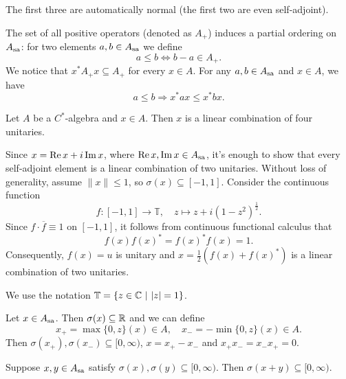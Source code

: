 \begin{remark}
  The first three are automatically normal (the first two are even self-adjoint).
\end{remark}

The set of all positive operators (denoted as $A_+$) induces a partial ordering on $A_{\operatorname{sa}}$: for two elements $a, b \in A_{\operatorname{sa}}$
we define $$a \leq b \Leftrightarrow b - a \in A_+.$$
We notice that $x^* A_+ x \subseteq A_+$ for every $x \in A$.
For any $a, b \in A_{\operatorname{sa}}$ and $x \in A$, we have 
$$a \leq b \Rightarrow x^* a x \leq x^* b x.$$

\begin{proposition}\label{prop:2}
  Let $A$ be a $C^*$-algebra and $x \in A$. Then $x$ is a linear combination of four unitaries.
\end{proposition}

\begin{myproof}
  Since $x = \operatorname{Re} x + i \operatorname{Im} x$, where $\operatorname{Re} x, \operatorname{Im} x \in A_{\operatorname{sa}}$,
  it's enough to show that every self-adjoint element is a linear combination of two unitaries.
  Without loss of generality, assume $\| x\| \leq 1$, so $\sigma(x) \subseteq [-1, 1]$.
  Consider the continuous function $$f: [-1, 1] \to \mathbb{T},\quad z \mapsto z + i(1 - z^2)^{\frac{1}{2}}.$$
  Since $f \cdot \overline{f} \equiv 1$ on $[-1, 1]$, it follows from continuous functional calculus that
  $$f(x) f(x)^* = f(x)^* f(x) = 1.$$
  Consequently, $f(x) = u$ is unitary and $x = \frac{1}{2} (f(x) + f(x)^*)$ is a linear combination of two unitaries. 
\end{myproof}

\begin{remark}
  We use the notation $\mathbb{T} = \{z \in \mathbb {C}\ |\ |z| = 1\}$.
\end{remark}

\begin{definition}
  Let $x \in A_{\operatorname{sa}}$. Then $\sigma(x) \subseteq \mathbb {R}$ and we can define 
  $$x_+ = \max \{0, z\} (x) \in A,\quad x_- = - \min \{0, z\} (x) \in A.$$
  Then $\sigma(x_+), \sigma(x_- ) \subseteq [0, \infty)$, $x = x_+ - x_-$
  and $x_+ x_- = x_- x_+ = 0$.
\end{definition}

\begin{lemma}
  Suppose $x, y \in A_{\operatorname{sa}}$ satisfy $\sigma(x), \sigma(y) \subseteq [0, \infty)$.
  Then $\sigma(x + y) \subseteq [0, \infty)$.
\end{lemma}

